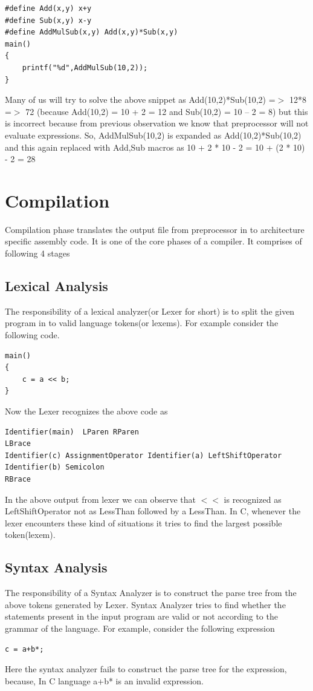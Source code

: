 \documentclass{article}
\begin{document}
\begin{verbatim}
#define Add(x,y) x+y
#define Sub(x,y) x-y
#define AddMulSub(x,y) Add(x,y)*Sub(x,y)
main()
{
    printf("%d",AddMulSub(10,2));
}
\end{verbatim}

Many of us will try to solve the above snippet as Add(10,2)*Sub(10,2) =$>$ 12*8 =$>$ 72 (because Add(10,2) = 10 + 2 = 12 and Sub(10,2) = 10 – 2 = 8) but this is incorrect because from previous observation we know that preprocessor will not evaluate expressions. So, AddMulSub(10,2) is expanded as Add(10,2)*Sub(10,2) and this again replaced with Add,Sub macros as 10 + 2 * 10 - 2 = 10 + (2 * 10) - 2 = 28

\section{Compilation}
Compilation phase translates the output file from preprocessor in to architecture specific assembly code. It is one of the core phases of a compiler. It comprises of following 4 stages
\subsection{Lexical Analysis}
The responsibility of a lexical analyzer(or Lexer for short) is to split the given program in to valid language tokens(or lexems).  For example consider the following code.
\begin{verbatim}
main()
{
    c = a << b;
}
\end{verbatim}
Now the Lexer recognizes the above code as
\begin{verbatim}
Identifier(main)  LParen RParen
LBrace
Identifier(c) AssignmentOperator Identifier(a) LeftShiftOperator Identifier(b) Semicolon
RBrace
\end{verbatim}
In the above output from lexer we can observe that $<<$ is recognized as LeftShiftOperator not as LessThan followed by a LessThan. In C, whenever the lexer encounters these kind of situations it tries to find the largest possible token(lexem).
\subsection{Syntax Analysis}
The responsibility of a Syntax Analyzer is to construct the parse tree from the above tokens generated by Lexer. Syntax Analyzer tries to find whether the statements present in the input program are valid or not according to the grammar of the language. For example, consider the following expression
\begin{verbatim}
c = a+b*;
\end{verbatim}
Here the syntax analyzer fails to construct the parse tree for the expression, because, In C language a+b* is an invalid expression.
\end{document}
